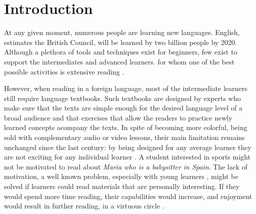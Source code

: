 
\section{Introduction}
At any given moment, numerous people are learning new languages. 
English, estimates the British Council, will be learned by two billion people by 2020. 
Although a plethora of tools and techniques exist for beginners, few exist to support the intermediates and advanced learners. for whom one of the best possible activities is extensive reading
\cite{Day98-Extensive,mccarthy1999-extensive,mccarthy1999-microcosm}. 


However, when reading in a foreign language, most of the intermediate learners still require language textbooks. Such textbooks are designed by experts who make sure that the texts are simple enough for the desired language level of a broad audience and that exercises that allow the readers to practice newly learned concepts acompany the texts. 
In spite of becoming more colorful, being sold with complementary audio or video lessons, their main limitation remains unchanged since the last century: 
by being designed for any average learner they are not exciting for any individual learner \cite{Hidi00-TheUnmotivated}. A student interested in sports might not be motivated to read about {\em Maria who is a babysitter in Spain}. 
% 
The lack of motivation, a well known problem, especially with young learners \cite{Hidi00-TheUnmotivated,renadya07-power}, might be solved if learners could read materials that are personally interesting. If they would spend more time reading, their capabilities would increase, and enjoyment would result in further reading, in a virtuous circle \cite{Brozo07-Engagement, Guthrie99-Motivation}.


